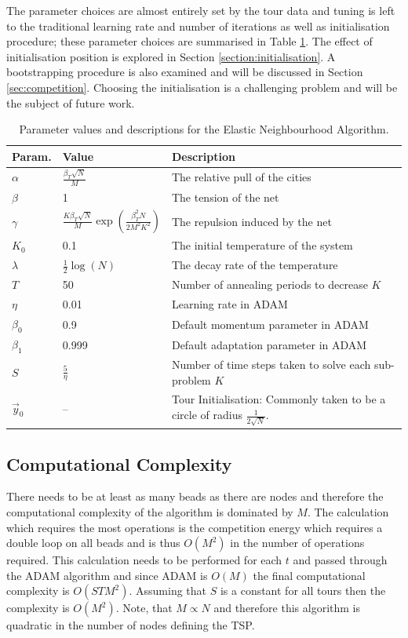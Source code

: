 The parameter choices are almost entirely set by the tour data and tuning is left to the traditional learning rate and number of iterations as well as initialisation procedure; these parameter choices are summarised in Table \ref{table:parametersEN}. The effect of initialisation position is explored in Section \ref{section:initialisation}. A bootstrapping procedure is also examined and will be discussed in Section \ref{sec:competition}. Choosing the initialisation is a challenging problem and will be the subject of future work.
\begin{table}
	\begin{tabular}[width=0.75\textwidth]{| l || l | l | |}
		\hline
		Param. & Value & Description \\
		\hline
		$\alpha$ & $\frac{\beta_T \sqrt{N}}{M}$ & The relative pull of the cities \\
		$\beta$ & 1 & The tension of the net \\
		$\gamma$ & $\frac{K\beta_T \sqrt{N}}{M}  \exp\left(\frac{\beta_T^2N}{2 M^2 K^2}\right)$ & The repulsion induced by the net \\
		$K_0$ & 0.1 & The initial temperature of the system \\
		$\lambda$ & $\frac{1}{2}\log(N)$ & The decay rate of the temperature \\
		$T$ & 50 & Number of annealing periods to decrease $K$ \\
		$\eta$ & 0.01 & Learning rate in ADAM \\
		$\beta_0$ & 0.9 & Default momentum parameter in ADAM \\
		$\beta_1$ & 0.999 & Default adaptation parameter in ADAM \\
		$S$ & $\frac{5}{\eta}$ & Number of time steps taken to solve each sub-problem $K$ \\
		$\vec{y}_0$ & -- & {Tour Initialisation: Commonly taken to be a circle of radius $\frac{1}{2\sqrt{N}}$}.\\
		\hline
	\end{tabular}
	\def\c{Parameter values and descriptions for the Elastic Neighbourhood Algorithm}
	\caption[\c]{\c. \label{table:parametersEN}}
	\end{table}

\subsection{Computational Complexity}
There needs to be at least as many beads as there are nodes and therefore the computational complexity of the algorithm is dominated by $M$. The calculation which requires the most operations is the competition energy which requires a double loop on all beads and is thus $O(M^2)$ in the number of operations required. This calculation needs to be performed for each $t$ and passed through the ADAM algorithm and since ADAM is $O(M)$ the final computational complexity is $O(S T M^2)$. Assuming that $S$ is a constant for all tours then the complexity is $ O(M^2)$. Note, that $M \propto N$ and therefore this algorithm is quadratic in the number of nodes defining the TSP.

